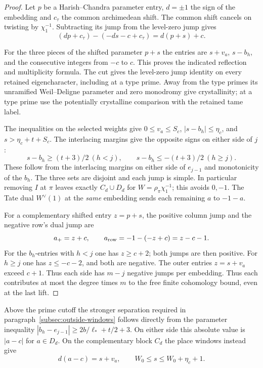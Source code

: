 \begin{proof}
Let \(p\) be a Harish--Chandra parameter
entry, \(d=\pm1\) the sign of the embedding and \(c_\tau\)
the common archimedean shift. The common shift cancels on twisting by \(\chi_1^{-1}\). Subtracting its jump from the level-zero jump gives
\[
 (dp+c_\tau)-(-ds-c+c_\tau)=d(p+s)+c.
\]

For the three pieces of the shifted parameter \(p+s\) the
entries are \(s+v_a\), \(s-b_h\), and the consecutive integers
from \(-c\) to \(c\). This proves the indicated reflection and
multiplicity formula. The cut gives the level-zero jump
identity on every retained eigencharacter, including at a
type prime. Away from the type primes its unramified
Weil--Deligne parameter and zero monodromy give
crystallinity; at a type prime use the potentially crystalline
comparison with the retained tame label.
\label{cor:marked-localization-5}

The inequalities on the selected weights give
\(0\le v_a\le S_c\), \(|s-b_h|\le\eta_c\), and
\(s>\eta_c+t+S_c\). The interlacing margins give the opposite signs on either side of \(j\):
\[
 s-b_h\ge(t+3)/2\ (h<j),\qquad s-b_h\le-(t+3)/2\ (h\ge j).
\]
These follow from the interlacing
margins on either side of \(e_{j-1}\) and monotonicity of
the \(b_h\). The three sets are disjoint and each jump is
simple. In particular removing \(I\) at \(\pi\) leaves
exactly \(C_d\cup D_d\) for \(W=\rho_\pi\chi_1^{-1}\);
this avoids \(0,-1\). The Tate dual \(W^\vee(1)\) at
the \emph{same} embedding sends each remaining \(a\) to
\(-1-a\).

For a complementary shifted entry \(z=p+s\), the positive
column jump and the negative row's dual jump are
\[
     a_+=z+c,\qquad a_{\rm row}=-1-(-z+c)=z-c-1 .
\]
For the \(b_h\)-entries with \(h<j\) one has \(z\ge c+2\);
both jumps are then positive. For \(h\ge j\) one has
\(z\le-c-2\), and both are negative. The outer entries
\(z=s+v_a\) exceed \(c+1\). Thus each side has \(m-j\)
negative jumps per embedding.
Thus each contributes at most the degree times \(m\) to
the free finite cohomology bound, even at the last lift.
\end{proof}

Above the prime cutoff the stronger separation required in
paragraph~\ref{subsec:outside-windows} follows directly from
the parameter inequality
\( |b_h-e_{j-1}|\ge 2b/\ell_*+t/2+3\). On either side
this absolute value is \(|a-c|\) for \(a\in D_d\).
On the complementary block \(C_d\) the place windows instead give
\[
 d(a-c)=s+v_a,\qquad W_0\le s\le W_0+\eta_c+1.
\]

